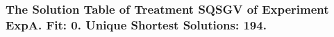  \begin{frame}
 \fontsize{8pt}{9pt}\selectfont
 \frametitle{ The Solution Table of Treatment SQSGV of Experiment ExpA. Fit: 0. Unique Shortest Solutions: 194. }

 \label{ExpASolutionTable005.tex}  
 \end{frame}

